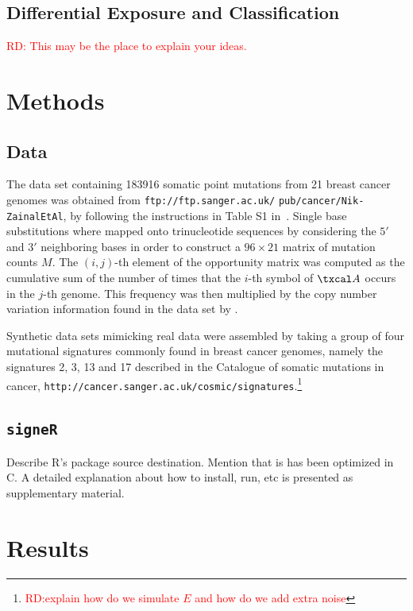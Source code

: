 \documentclass{bioinfo}
\newcommand{\CC}{C\nolinebreak\hspace{-.05em}\raisebox{.4ex}{\tiny\bf
    +}\nolinebreak\hspace{-.10em}\raisebox{.4ex}{\tiny\bf +}}
\begin{document}
\subsection{Differential Exposure and Classification}
\textcolor{red}{RD: This may be the place to explain your 
ideas.} 


\section{Methods}
\subsection{Data} The data set containing 183916 somatic point
mutations from 21 breast cancer genomes was obtained from
\verb+ftp://ftp.sanger.ac.uk/+ \verb+pub/cancer/Nik-ZainalEtAl+, by
following the instructions in Table S1 in~\cite{NCell}. Single base 
substitutions where mapped onto trinucleotide sequences by considering
the $5'$ and $3'$ neighboring bases in order to construct a $96\times
21$ matrix of mutation counts $M$. 
The $(i,j)$-th element of the opportunity matrix was computed as the
cumulative sum of the number of times that the $i$-th symbol of
$\txcal A$ occurs in the $j$-th genome. This frequency was then
multiplied by the copy number variation information found in the data 
set by \cite{NCell}.


Synthetic data sets mimicking real data were assembled by taking a
group of four mutational signatures commonly found in 
breast cancer genomes, namely the signatures 2, 3, 13 and 17 described  
in the Catalogue  of somatic  mutations in cancer,
\verb~http://cancer.sanger.ac.uk/cosmic/signatures~.\footnote{\textcolor{red}{RD:explain how do we simulate $E$ and how do we add extra noise}} 


\subsection{\texttt{signeR}} Describe R's package 
source destination. Mention that is has been optimized in
\CC. A detailed explanation about how to install, run, etc is
presented as supplementary material.

\section{Results}
\end{document}
